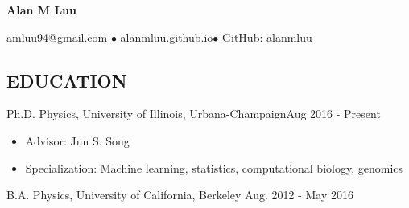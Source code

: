 \documentclass{res}
\newcommand{\rfill}{\hspace*{\fill}}
\begin{document}
\raggedright
\centerline{\LARGE \textbf{Alan M Luu}}
\vspace{-10pt}
\noindent %
\centerline{ \href{mailto:amluu94@gmail.com}{amluu94@gmail.com} $\bullet$
\href{http://alanmluu.github.io}{alanmluu.github.io}$\bullet$
 GitHub: \href{https://github.com/alanmluu}{alanmluu}}
\vspace{1pt}
 \vspace{5pt}
\begin{resume}
\vspace{-30pt}
\section{EDUCATION}
\vspace{2pt}Ph.D. Physics, University of Illinois, Urbana-Champaign\rfill Aug 2016 - Present
\vspace{2pt}
\begin{itemize}
\item Advisor: Jun S. Song
\item Specialization: Machine learning, statistics, computational biology, genomics
\end{itemize}
\vspace{-8pt}B.A. Physics, University of California, Berkeley \rfill Aug. 2012 - May 2016
\vspace{-5pt}

\end{resume}
\end{document}
